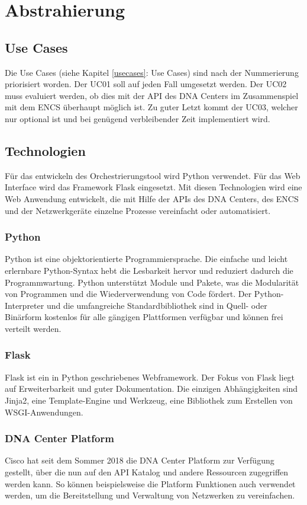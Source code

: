 \section{Abstrahierung}

\subsection{Use Cases} 
Die Use Cases (siehe Kapitel \ref{usecases}: Use Cases) sind nach der Nummerierung priorisiert worden. Der UC01 soll auf jeden Fall umgesetzt werden. Der UC02 muss evaluiert werden, ob dies mit der API des DNA Centers im Zusammenspiel mit dem ENCS überhaupt möglich ist. Zu guter Letzt kommt der UC03, welcher nur optional ist und bei genügend verbleibender Zeit implementiert wird.


\subsection{Technologien}
Für das entwickeln des Orchestrierungstool wird Python verwendet. Für das Web Interface wird das Framework Flask eingesetzt. Mit diesen Technologien wird eine Web Anwendung entwickelt, die mit Hilfe der APIs des DNA Centers, des ENCS und der Netzwerkgeräte einzelne Prozesse vereinfacht oder automatisiert.

\subsubsection{Python}
Python ist eine objektorientierte Programmiersprache. Die einfache und leicht erlernbare Python-Syntax hebt die Lesbarkeit hervor und reduziert dadurch die Programmwartung. Python unterstützt Module und Pakete, was die Modularität von Programmen und die Wiederverwendung von Code fördert. Der Python-Interpreter und die umfangreiche Standardbibliothek sind in Quell- oder Binärform kostenlos für alle gängigen Plattformen verfügbar und können frei verteilt werden. \cite{python}

\subsubsection{Flask}
Flask ist ein in Python geschriebenes Webframework. Der Fokus von Flask liegt auf Erweiterbarkeit und guter Dokumentation. Die einzigen Abhängigkeiten sind Jinja2, eine Template-Engine und Werkzeug, eine Bibliothek zum Erstellen von WSGI-Anwendungen. \cite{flask}

\subsubsection{DNA Center Platform}
Cisco hat seit dem Sommer 2018 die DNA Center Platform zur Verfügung gestellt, über die nun auf den API Katalog und andere Ressourcen zugegriffen werden kann. So können beispielsweise die Platform Funktionen auch verwendet werden, um die Bereitstellung und Verwaltung von Netzwerken zu vereinfachen.


